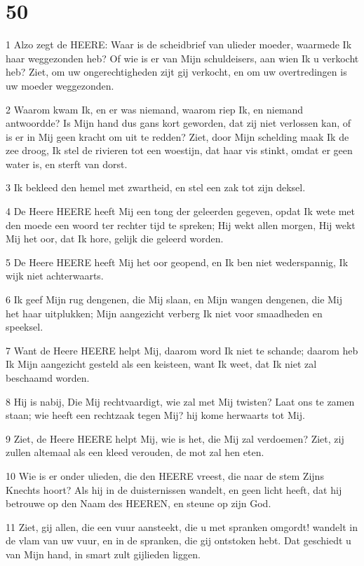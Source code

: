 \chapter{50}

\par 1 Alzo zegt de HEERE: Waar is de scheidbrief van ulieder moeder, waarmede Ik haar weggezonden heb? Of wie is er van Mijn schuldeisers, aan wien Ik u verkocht heb? Ziet, om uw ongerechtigheden zijt gij verkocht, en om uw overtredingen is uw moeder weggezonden.
\par 2 Waarom kwam Ik, en er was niemand, waarom riep Ik, en niemand antwoordde? Is Mijn hand dus gans kort geworden, dat zij niet verlossen kan, of is er in Mij geen kracht om uit te redden? Ziet, door Mijn schelding maak Ik de zee droog, Ik stel de rivieren tot een woestijn, dat haar vis stinkt, omdat er geen water is, en sterft van dorst.
\par 3 Ik bekleed den hemel met zwartheid, en stel een zak tot zijn deksel.
\par 4 De Heere HEERE heeft Mij een tong der geleerden gegeven, opdat Ik wete met den moede een woord ter rechter tijd te spreken; Hij wekt allen morgen, Hij wekt Mij het oor, dat Ik hore, gelijk die geleerd worden.
\par 5 De Heere HEERE heeft Mij het oor geopend, en Ik ben niet wederspannig, Ik wijk niet achterwaarts.
\par 6 Ik geef Mijn rug dengenen, die Mij slaan, en Mijn wangen dengenen, die Mij het haar uitplukken; Mijn aangezicht verberg Ik niet voor smaadheden en speeksel.
\par 7 Want de Heere HEERE helpt Mij, daarom word Ik niet te schande; daarom heb Ik Mijn aangezicht gesteld als een keisteen, want Ik weet, dat Ik niet zal beschaamd worden.
\par 8 Hij is nabij, Die Mij rechtvaardigt, wie zal met Mij twisten? Laat ons te zamen staan; wie heeft een rechtzaak tegen Mij? hij kome herwaarts tot Mij.
\par 9 Ziet, de Heere HEERE helpt Mij, wie is het, die Mij zal verdoemen? Ziet, zij zullen altemaal als een kleed verouden, de mot zal hen eten.
\par 10 Wie is er onder ulieden, die den HEERE vreest, die naar de stem Zijns Knechts hoort? Als hij in de duisternissen wandelt, en geen licht heeft, dat hij betrouwe op den Naam des HEEREN, en steune op zijn God.
\par 11 Ziet, gij allen, die een vuur aansteekt, die u met spranken omgordt! wandelt in de vlam van uw vuur, en in de spranken, die gij ontstoken hebt. Dat geschiedt u van Mijn hand, in smart zult gijlieden liggen.

